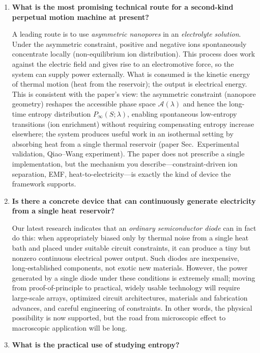 \documentclass[11pt,a4paper]{article}
\begin{document}
\begin{enumerate}[leftmargin=*]
\item \textbf{What is the most promising technical route for a second-kind perpetual motion machine at present?}

A leading route is to use \emph{asymmetric nanopores} in an \emph{electrolyte solution}. Under the asymmetric constraint, positive and negative ions spontaneously concentrate locally (non-equilibrium ion distribution). This process does work against the electric field and gives rise to an electromotive force, so the system can supply power externally. What is consumed is the kinetic energy of thermal motion (heat from the reservoir); the output is electrical energy. This is consistent with the paper's view: the asymmetric constraint (nanopore geometry) reshapes the accessible phase space $\mathcal{A}(\lambda)$ and hence the long-time entropy distribution $P_{\infty}(S;\lambda)$, enabling spontaneous low-entropy transitions (ion enrichment) without requiring compensating entropy increase elsewhere; the system produces useful work in an isothermal setting by absorbing heat from a single thermal reservoir (paper Sec.~Experimental validation, Qiao--Wang experiment). The paper does not prescribe a single implementation, but the mechanism you describe---constraint-driven ion separation, EMF, heat-to-electricity---is exactly the kind of device the framework supports.

\item \textbf{Is there a concrete device that can continuously generate electricity from a single heat reservoir?}

Our latest research indicates that an \emph{ordinary semiconductor diode} can in fact do this: when appropriately biased only by thermal noise from a single heat bath and placed under suitable circuit constraints, it can produce a tiny but nonzero continuous electrical power output. Such diodes are inexpensive, long-established components, not exotic new materials. However, the power generated by a single diode under these conditions is extremely small; moving from proof-of-principle to practical, widely usable technology will require large-scale arrays, optimized circuit architectures, materials and fabrication advances, and careful engineering of constraints. In other words, the physical possibility is now supported, but the road from microscopic effect to macroscopic application will be long.

\item \textbf{What is the practical use of studying entropy?}


\end{enumerate}
\end{document}
